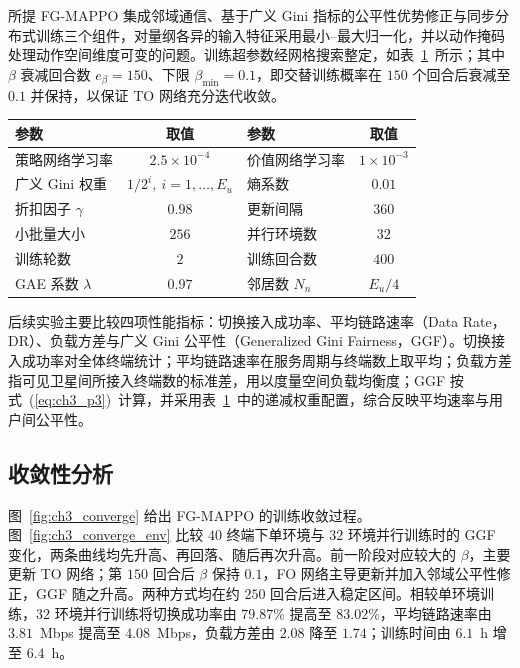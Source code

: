 所提 FG-MAPPO 集成邻域通信、基于广义 Gini 指标的公平性优势修正与同步分布式训练三个组件，对量纲各异的输入特征采用最小--最大归一化，并以动作掩码处理动作空间维度可变的问题。训练超参数经网格搜索整定，如表~\ref{tab:ch3_train_params}~所示；其中 $\beta$ 衰减回合数 $e_\beta=150$、下限 $\beta_{\min}=0.1$，即交替训练概率在 $150$ 个回合后衰减至 $0.1$ 并保持，以保证 TO 网络充分迭代收敛。

\begin{table}[!htp]
  \centering
  \label{tab:ch3_train_params}
  \begin{tabular}{l|c|l|c}
    \toprule
    参数 & 取值 & 参数 & 取值 \\
    \midrule
    策略网络学习率 & $2.5\times10^{-4}$ & 价值网络学习率 & $1\times10^{-3}$ \\
    广义 Gini 权重 & $1/2^i,~i=1,\dots,E_u$ & 熵系数 & $0.01$ \\
    折扣因子 $\gamma$ & $0.98$ & 更新间隔 & $360$ \\
    小批量大小 & $256$ & 并行环境数 & $32$ \\
    训练轮数 & $2$ & 训练回合数 & $400$ \\
    GAE 系数 $\lambda$ & $0.97$ & 邻居数 $N_n$ & $E_u/4$ \\
    \bottomrule
  \end{tabular}
\end{table}

后续实验主要比较四项性能指标：切换接入成功率、平均链路速率（Data Rate，DR）、负载方差与广义 Gini 公平性（Generalized Gini Fairness，GGF）。切换接入成功率对全体终端统计；平均链路速率在服务周期与终端数上取平均；负载方差指可见卫星间所接入终端数的标准差，用以度量空间负载均衡度；GGF 按式~(\ref{eq:ch3_p3})~计算，并采用表~\ref{tab:ch3_train_params}~中的递减权重配置，综合反映平均速率与用户间公平性。

\subsection{收敛性分析}
\label{subsec:ch3_convergence}

图~\ref{fig:ch3_converge} 给出 FG-MAPPO 的训练收敛过程。图~\ref{fig:ch3_converge_env} 比较 $40$ 终端下单环境与 $32$ 环境并行训练时的 GGF 变化，两条曲线均先升高、再回落、随后再次升高。前一阶段对应较大的 $\beta$，主要更新 TO 网络；第 $150$ 回合后 $\beta$ 保持 $0.1$，FO 网络主导更新并加入邻域公平性修正，GGF 随之升高。两种方式均在约 $250$ 回合后进入稳定区间。相较单环境训练，$32$ 环境并行训练将切换成功率由 $79.87\%$ 提高至 $83.02\%$，平均链路速率由 $3.81$~Mbps 提高至 $4.08$~Mbps，负载方差由 $2.08$ 降至 $1.74$；训练时间由 $6.1$~h 增至 $6.4$~h。

